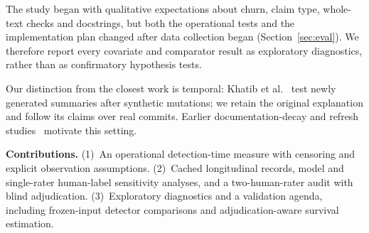 The study began with qualitative expectations about churn, claim type, whole-text checks and docstrings, but both the operational tests and the implementation plan changed after data collection began (Section~\ref{sec:eval}). We therefore report every covariate and comparator result as exploratory diagnostics, rather than as confirmatory hypothesis tests.

Our distinction from the closest work is temporal: Khatib et al.~\cite{khatib2026mutation} test newly generated summaries after synthetic mutations; we retain the original explanation and follow its claims over real commits. Earlier documentation-decay and refresh studies~\cite{hata2019links,tan2022outdated,kelious2026codens} motivate this setting.

\textbf{Contributions.} (1)~An operational detection-time measure with censoring and explicit observation assumptions. (2)~Cached longitudinal records, model and single-rater human-label sensitivity analyses, and a two-human-rater audit with blind adjudication. (3)~Exploratory diagnostics and a validation agenda, including frozen-input detector comparisons and adjudication-aware survival estimation.
